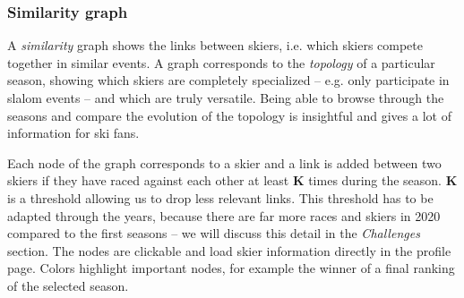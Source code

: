 \subsubsection{Similarity graph}

A \textit{similarity} graph shows the links between skiers, i.e. which skiers compete together in similar events.
A graph corresponds to the \textit{topology} of a particular season, showing which skiers are completely specialized -- e.g. only participate in slalom events -- and which are truly versatile.
Being able to browse through the seasons and compare the evolution of the topology is insightful and gives a lot of information for ski fans.

Each node of the graph corresponds to a skier and a link is added between two skiers if they have raced against each other at least \textbf{K} times during the season.
\textbf{K} is a threshold allowing us to drop less relevant links.
This threshold has to be adapted through the years, because there are far more races and skiers in 2020 compared to the first seasons -- we will discuss this detail in the \textit{Challenges} section.
The nodes are clickable and load skier information directly in the profile page.
Colors highlight important nodes, for example the winner of a final ranking of the selected season.

\newpage
